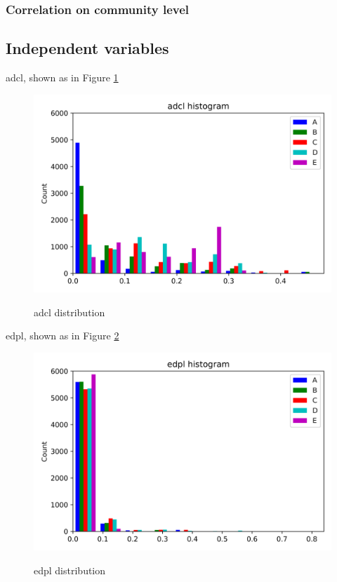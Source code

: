 \documentclass{article}
\begin{document}
\subsubsection{Correlation on community level}

\subsection{Independent variables}

adcl, shown as in Figure \ref{adcl-community}
\begin{figure}[htbp]
	\centering
	\includegraphics[width=\textwidth, keepaspectratio]{adcl-community.png}\\
	\caption{adcl distribution}
	\label{adcl-community}
\end{figure}



edpl, shown as in Figure \ref{edpl-community}
\begin{figure}[htbp]
	\centering
	\includegraphics[width=\textwidth, keepaspectratio]{edpl-community.png}\\
	\caption{edpl distribution}
	\label{edpl-community}
\end{figure}
\end{document}
